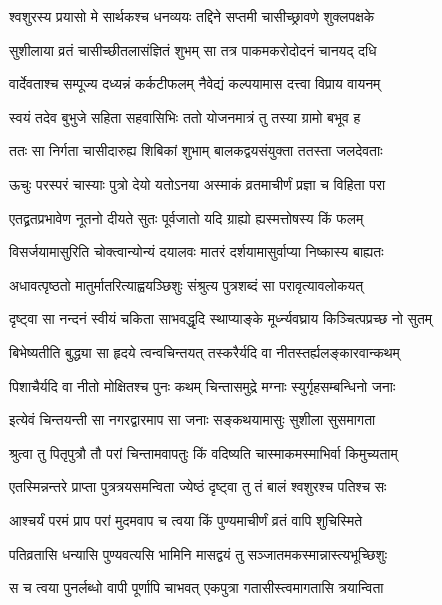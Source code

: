\twolineshloka
{श्वशुरस्य प्रयासो मे सार्थकश्च धनव्ययः}
{तद्दिने सप्तमी चासीच्छ्रावणे शुक्लपक्षके} %

\twolineshloka
{सुशीलाया व्रतं चासीच्छीतलासंज्ञितं शुभम्}
{सा तत्र पाकमकरोदोदनं चानयद् दधि} %

\twolineshloka
{वार्देवताश्च सम्पूज्य दध्यन्नं कर्कटीफलम्}
{नैवेद्यं कल्पयामास दत्त्वा विप्राय वायनम्} %

\twolineshloka
{स्वयं तदेव बुभुजे सहिता सहवासिभिः}
{ततो योजनमात्रं तु तस्या ग्रामो बभूव ह} %

\twolineshloka
{ततः सा निर्गता चासीदारुह्य शिबिकां शुभाम्}
{बालकद्वयसंयुक्ता ततस्ता जलदेवताः} %

\twolineshloka
{ऊचुः परस्परं चास्याः पुत्रो देयो यतोऽनया}
{अस्माकं व्रतमाचीर्णं प्रज्ञा च विहिता परा} %

\twolineshloka
{एतद्व्रतप्रभावेण नूतनो दीयते सुतः}
{पूर्वजातो यदि ग्राह्यो ह्यस्मत्तोषस्य किं फलम्} %

\twolineshloka
{विसर्जयामासुरिति चोक्त्वान्योन्यं दयालवः}
{मातरं दर्शयामासुर्वाप्या निष्कास्य बाह्यतः} %

\twolineshloka
{अधावत्पृष्ठतो मातुर्मातरित्याह्वयञ्छिशुः}
{संश्रुत्य पुत्रशब्दं सा परावृत्यावलोकयत्} %

\twolineshloka
{दृष्ट्वा सा नन्दनं स्वीयं चकिता साभवद्धृदि}
{स्थाप्याङ्के मूर्ध्न्यवघ्राय किञ्चित्पप्रच्छ नो सुतम्} %

\twolineshloka
{बिभेष्यतीति बुद्ध्या सा हृदये त्वन्वचिन्तयत्}
{तस्करैर्यदि वा नीतस्तर्ह्यलङ्कारवान्कथम्} %

\twolineshloka
{पिशाचैर्यदि वा नीतो मोक्षितश्च पुनः कथम्}
{चिन्तासमुद्रे मग्नाः स्युर्गृहसम्बन्धिनो जनाः} %

\twolineshloka
{इत्येवं चिन्तयन्ती सा नगरद्वारमाप सा}
{जनाः सङ्कथयामासुः सुशीला सुसमागता} %

\twolineshloka
{श्रुत्वा तु पितृपुत्रौ तौ परां चिन्तामवापतुः}
{किं वदिष्यति चास्माकमस्माभिर्वा किमुच्यताम्} %

\twolineshloka
{एतस्मिन्नन्तरे प्राप्ता पुत्रत्रयसमन्विता}
{ज्येष्ठं दृष्ट्वा तु तं बालं श्वशुरश्च पतिश्च सः} %

\twolineshloka
{आश्चर्यं परमं प्राप परां मुदमवाप च}
{त्वया किं पुण्यमाचीर्णं व्रतं वापि शुचिस्मिते} %

\twolineshloka
{पतिव्रतासि धन्यासि पुण्यवत्यसि भामिनि}
{मासद्वयं तु सञ्जातमकस्मान्नास्त्यभूच्छिशुः} %

\twolineshloka
{स च त्वया पुनर्लब्धो वापी पूर्णापि चाभवत्}
{एकपुत्रा गतासीस्त्वमागतासि त्रयान्विता} %

